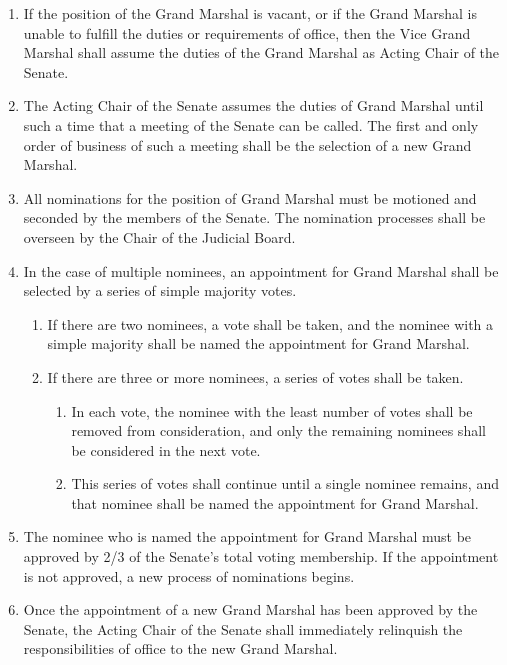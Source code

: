 
\begin{enumerate}
\item If the position of the Grand Marshal is vacant, or if the Grand Marshal is unable to fulfill the duties or requirements of office, then the Vice Grand Marshal shall assume the duties of the Grand Marshal as Acting Chair of the Senate.
\item The Acting Chair of the Senate assumes the duties of Grand Marshal until such a time that a meeting of the Senate can be called. The first and only order of business of such a meeting shall be the selection of a new Grand Marshal.
\item All nominations for the position of Grand Marshal must be motioned and seconded by the members of the Senate. The nomination processes shall be overseen by the Chair of the Judicial Board.
\item In the case of multiple nominees, an appointment for Grand Marshal shall be selected by a series of simple majority votes.
  \begin{enumerate}
  \item If there are two nominees, a vote shall be taken, and the nominee with a simple majority shall be named the appointment for Grand Marshal.
  \item If there are three or more nominees, a series of votes shall be taken.
    \begin{enumerate}
    \item In each vote, the nominee with the least number of votes shall be removed from consideration, and only the remaining nominees shall be considered in the next vote.
    \item This series of votes shall continue until a single nominee remains, and that nominee shall be named the appointment for Grand Marshal.
    \end{enumerate}
  \end{enumerate}
\item The nominee who is named the appointment for Grand Marshal must be approved by 2/3 of the Senate’s total voting membership. If the appointment is not approved, a new process of nominations begins.
\item Once the appointment of a new Grand Marshal has been approved by the Senate, the Acting Chair of the Senate shall immediately relinquish the responsibilities of office to the new Grand Marshal.
\end{enumerate}

